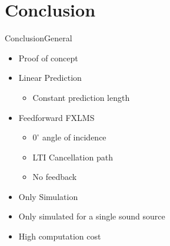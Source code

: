 \section{Conclusion}
\begin{frame}{Conclusion}{General}		
\begin{itemize}
	\item Proof of concept
	\item Linear Prediction
	\begin{itemize}
		\item Constant prediction length
	\end{itemize}
	\item Feedforward FXLMS
	\begin{itemize}
		\item $0^\circ$ angle of incidence
		\item LTI Cancellation path
		\item No feedback
	\end{itemize}
	\item Only Simulation
	\item Only simulated for a single sound source
	\item High computation cost
\end{itemize}
\end{frame}

